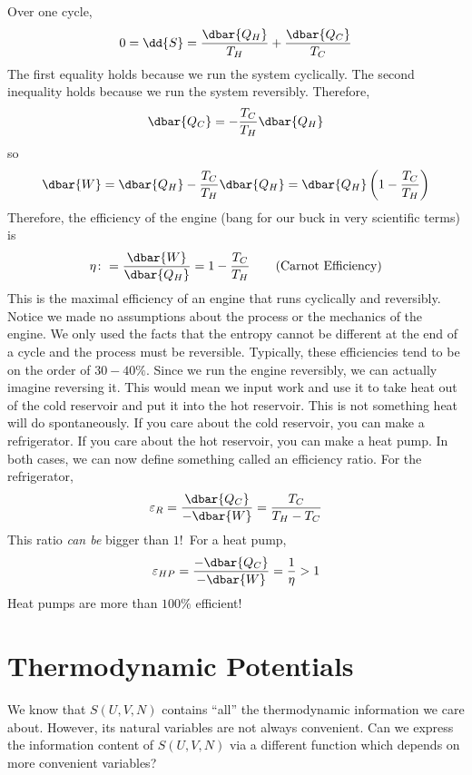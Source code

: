 \documentclass[a4paper,twoside,master.tex]{subfiles}
\begin{document}
Over one cycle,
\begin{equation}
    0 = \dd{S} = \frac{\dbar{Q_H}}{T_H} + \frac{\dbar{Q_C}}{T_C}
\end{equation}
The first equality holds because we run the system cyclically. The second inequality holds because we run the system reversibly. Therefore,
\begin{equation}
    \dbar{Q_C} = - \frac{T_C}{T_H} \dbar{Q_H}
\end{equation}
so
\begin{equation}
    \dbar{W} = \dbar{Q_H} - \frac{T_C}{T_H} \dbar{Q_H} = \dbar{Q_H} \left( 1 - \frac{T_C}{T_H} \right)
\end{equation}
Therefore, the efficiency of the engine (bang for our buck in very scientific terms) is
\begin{equation}\label{eq:carnot_eff}
    \eta \colon = \frac{\dbar{W}}{\dbar{Q_H}} = 1 - \frac{T_C}{T_H}\tag{Carnot Efficiency}
\end{equation}
This is the maximal efficiency of an engine that runs cyclically and reversibly. Notice we made no assumptions about the process or the mechanics of the engine. We only used the facts that the entropy cannot be different at the end of a cycle and the process must be reversible. Typically, these efficiencies tend to be on the order of $ 30-40\% $. Since we run the engine reversibly, we can actually imagine reversing it. This would mean we input work and use it to take heat out of the cold reservoir and put it into the hot reservoir. This is not something heat will do spontaneously. If you care about the cold reservoir, you can make a refrigerator. If you care about the hot reservoir, you can make a heat pump. In both cases, we can now define something called an efficiency ratio. For the refrigerator,
\begin{equation}
    \varepsilon_R = \frac{\dbar{Q_C}}{-\dbar{W}} = \frac{T_C}{T_H - T_C}
\end{equation}
This ratio \textit{can be} bigger than $ 1 $!\ For a heat pump,
\begin{equation}
    \varepsilon_{HP} = \frac{-\dbar{Q_C}}{-\dbar{W}} = \frac{1}{\eta} > 1
\end{equation}
Heat pumps are more than $ 100\% $ efficient!

\section{Thermodynamic Potentials}
\label{sec:thermodynamic_potentials}

We know that $ S(U,V,N) $ contains ``all'' the thermodynamic information we care about. However, its natural variables are not always convenient. Can we express the information content of $ S(U,V,N) $ via a different function which depends on more convenient variables?
\end{document}
